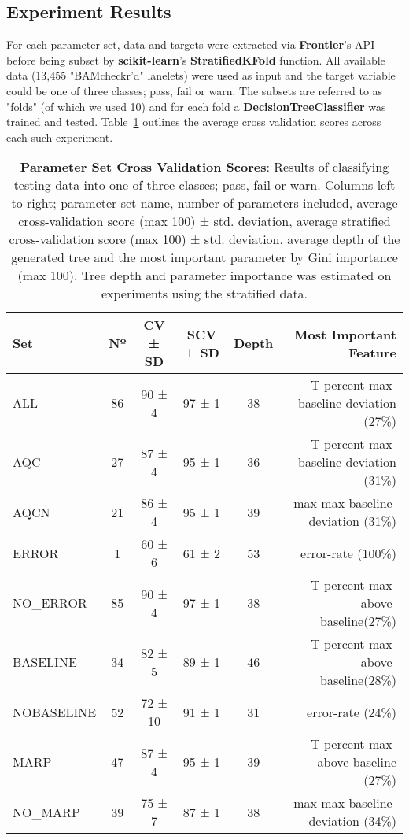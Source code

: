 \subsection{Experiment Results}
For each parameter set, data and targets were extracted via \textbf{Frontier}'s
API before being subset by \textbf{scikit-learn}'s \textbf{StratifiedKFold}
function. All available data (13,455 "BAMcheckr'd" lanelets) were used as input
and the target variable could be one of three classes; pass, fail or warn.
The subsets are referred to as "folds" (of which we used 10) and for
each fold a \textbf{DecisionTreeClassifier} was trained and tested.
Table~\ref{tab:pset-cv} outlines the average cross validation scores across each
such experiment.

\begin{table}
    \centering
    \begin{tabular}{l | c  c  c  c  r}
        Set           & Nº & CV ± SD & SCV ± SD & Depth & Most Important Feature\\
        \hline
        ALL           & 86 & 90 ± 4 & 97 ± 1 & 38 & T-percent-max-baseline-deviation (27\%)\\
        AQC           & 27 & 87 ± 4 & 95 ± 1 & 36 & T-percent-max-baseline-deviation (31\%)\\
        AQCN          & 21 & 86 ± 4 & 95 ± 1 & 39 & max-max-baseline-deviation (31\%)\\
        ERROR         & 1  & 60 ± 6 & 61 ± 2 & 53 & error-rate (100\%)\\
        NO\_ERROR     & 85 & 90 ± 4 & 97 ± 1 & 38 & T-percent-max-above-baseline(27\%)\\
        BASELINE      & 34 & 82 ± 5 & 89 ± 1 & 46 & T-percent-max-above-baseline(28\%)\\
        NOBASELINE    & 52 & 72 ± 10 & 91 ± 1 & 31 & error-rate (24\%)\\
        MARP          & 47 & 87 ± 4 & 95 ± 1 & 39 & T-percent-max-above-baseline (27\%)\\
        NO\_MARP      & 39 & 75 ± 7 & 87 ± 1 & 38 & max-max-baseline-deviation (34\%)\\
    \end{tabular}

    \caption[pset-cv]{\textbf{Parameter Set Cross Validation Scores}: Results of
        classifying testing data into one of three classes; pass, fail or warn.
        Columns left to right; parameter set name, number of parameters
        included, average cross-validation score (max 100) ± std. deviation,
        average stratified cross-validation score (max 100) ± std. deviation,
        average depth of the generated tree and the most important parameter by
        Gini importance (max 100). Tree depth and parameter importance was
    estimated on experiments using the stratified data.}

    \label{tab:pset-cv}
\end{table}

